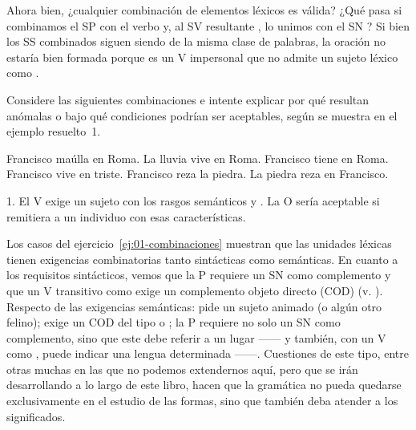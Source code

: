 Ahora bien, ¿cualquier combinación de elementos léxicos es válida? ¿Qué pasa si
combinamos el SP  con el verbo  y, al SV resultante
, lo unimos con el SN ? Si bien los SS
combinados siguen siendo de la misma clase de palabras, la oración
 no estaría bien formada porque
 es un V impersonal que no admite un sujeto léxico como
.

\begin{ejercicio}\label{ej:01-combinaciones}
Considere las siguientes combinaciones e intente explicar por qué resultan
anómalas o bajo qué condiciones podrían ser aceptables, según se muestra en el
ejemplo resuelto~1.

\begin{exe}
  \ex Francisco maúlla en Roma.
  \ex La lluvia vive en Roma.
  \ex Francisco tiene en Roma.
  \ex Francisco vive en triste.
  \ex Francisco reza la piedra.
  \ex La piedra reza en Francisco.
\end{exe}

\begin{resuelto}
1. El V  exige un sujeto con los rasgos semánticos
 y . La O sería aceptable si 
remitiera a un individuo con esas características.
\end{resuelto}
\end{ejercicio}

Los casos del ejercicio~\ref{ej:01-combinaciones} muestran que las unidades
léxicas tienen exigencias combinatorias tanto sintácticas como semánticas. En
cuanto a los requisitos sintácticos, vemos que la P requiere un SN como
complemento y que un V transitivo como  exige un complemento
objeto directo (COD) (v. ). Respecto de las exigencias semánticas:
 pide un sujeto animado  (o algún otro felino);
 exige un COD del tipo  o ; la P
 requiere no solo un SN como complemento, sino que este debe referir
a un lugar ------ y también, con un V como
, puede indicar una lengua determinada ------. Cuestiones de este tipo, entre otras muchas en las que no podemos
extendernos aquí, pero que se irán desarrollando a lo largo de este libro,
hacen que la gramática no pueda quedarse exclusivamente en el estudio de las
formas, sino que también deba atender a los significados.

